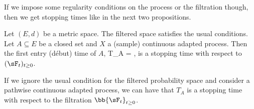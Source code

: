If we impose some regularity conditions on the process or the filtration though, then we get stopping times like in the next two propositions.

\begin{proposition}\label{pro:debut_time_closed_set_stopping_time}%
Let $(E,d)$ be a metric space. The filtered space satisfies the usual conditions. Let $A\subseteq E$ be a closed set and $X$ a (sample) continuous adapted process. Then the first entry (d\'ebut) time of $A$, 
\be 
T_A = \inf{}, 
\ee 
is a stopping time with respect to $(\sF_t)_{t\geq 0}$.

If we ignore the usual condition for the filtered probability space and consider a pathwise continuous adapted process, we can have that $T_A$ is a stopping time with respect to the filtration $\bb{\sF_{t}}_{t\geq 0}$.
\end{proposition}

